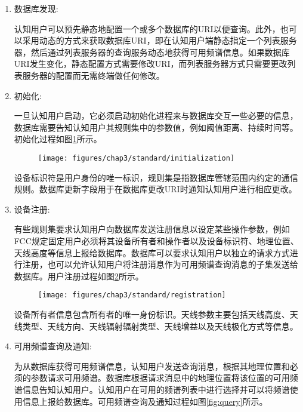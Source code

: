 \begin{enumerate}
\item 数据库发现:

认知用户可以预先静态地配置一个或多个数据库的URI以便查询。此外，也可以采用动态的方式来获取数据库URI，即在认知用户端静态指定一个列表服务器，然后通过列表服务器的查询服务动态地获得可用频谱信息。如果数据库URI发生变化，静态配置方式需要修改URI，而列表服务器方式只需要更改列表服务器的配置而无需终端做任何修改。


\item 初始化:

一旦认知用户启动，它必须启动初始化进程来与数据库交互一些必要的信息，数据库需要告知认知用户其规则集中的参数值，例如阈值距离、持续时间等。初始化过程如图\ref{fig:initialization}所示。

\begin{figure}[!htp]\label{fig:initialization}
  \centering
  \texttt{[image: figures/chap3/standard/initialization]}
\end{figure}

设备标识符是用户身份的唯一标识，规则集是指数据库管辖范围内约定的通信规则。数据库更新字段用于在数据库更改URI时通知认知用户进行相应更改。

\item 设备注册:

有些规则集要求认知用户向数据库发送注册信息以设定某些操作参数，例如FCC规定固定用户必须将其设备所有者和操作者以及设备标识符、地理位置、天线高度等信息上报给数据库。数据库可以要求认知用户以独立的请求方式进行注册，也可以允许认知用户将注册消息作为可用频谱查询消息的子集发送给数据库。用户注册过程如图\ref{fig:registration}所示。

\begin{figure}[!htp]\label{fig:registration}
  \centering
  \texttt{[image: figures/chap3/standard/registration]}
\end{figure}

设备所有者信息包含所有者的唯一身份标识。天线参数主要包括天线高度、天线类型、天线方向、天线辐射辐射类型、天线增益以及天线极化方式等信息。

\item 可用频谱查询及通知:

为从数据库获得可用频谱信息，认知用户发送查询消息，根据其地理位置和必须的参数请求可用频谱。数据库根据请求消息中的地理位置将该位置的可用频谱信息告知认知用户。认知用户在可用的频谱列表中进行选择并可以将频谱使用信息上报给数据库。可用频谱查询及通知过程如图\ref{fig:query}所示。


\end{enumerate}

